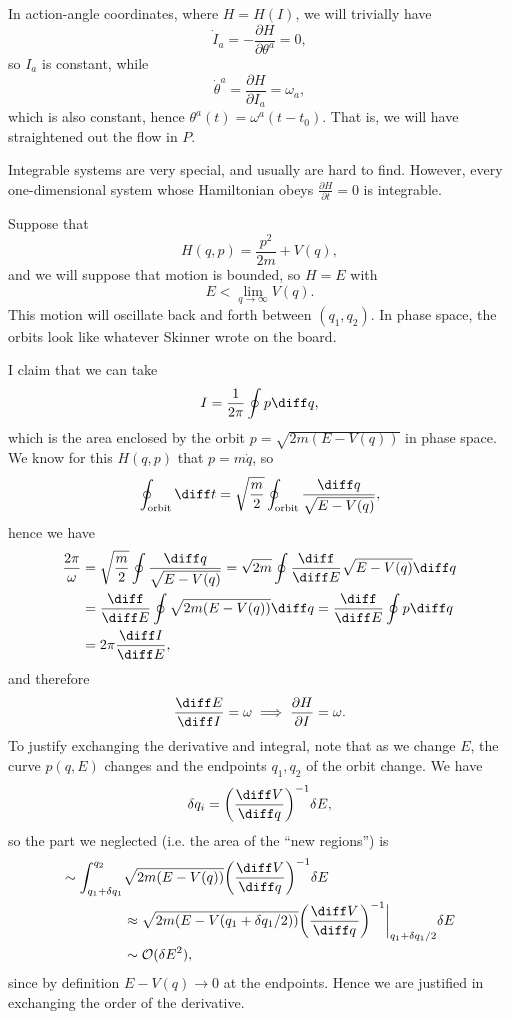 \documentclass[12pt]{article}
\begin{document}
In action-angle coordinates, where $H = H(I)$, we will trivially have
\[
\dot I_a = - \frac{\partial H}{\partial \theta^a} = 0,
\]
so $I_a$ is constant, while
\[
\dot \theta^a = \frac{\partial H}{\partial I_a} = \omega_a,
\]
which is also constant, hence $\theta^a(t) = \omega^a(t - t_0)$. That is, we will have straightened out the flow in $P$.

Integrable systems are very special, and usually are hard to find. However, every one-dimensional system whose Hamiltonian obeys $\frac{\partial H}{\partial t} = 0$ is integrable.

\begin{exbox}
	Suppose that
	\[
	H(q,p) = \frac{p^2}{2m} + V(q),
	\]
	and we will suppose that motion is bounded, so $H = E$ with
	\[
	E < \lim_{q \to \infty}V(q).
	\]
	This motion will oscillate back and forth between $(q_1, q_2)$. In phase space, the orbits look like whatever Skinner wrote on the board.

	I claim that we can take
	\[
	I = \frac{1}{2 \pi} \oint p \diff q,
	\]
	which is the area enclosed by the orbit $p = \sqrt{2m(E - V(q))}$ in phase space. We know for this $H(q, p)$ that $p = m \dot q$, so
	\[
		\oint_{\mathrm{orbit}}\diff t = \sqrt{\frac{m}{2}} \oint_{\mathrm{orbit}} \frac{\diff q}{\sqrt{E - V(q)}},
	\]
	hence we have
	\begin{align*}
		\frac{2\pi}{\omega} &= \sqrt{\frac{m}{2}} \oint \frac{\diff q}{\sqrt{E - V(q)}} = \sqrt{2m} \oint \frac{\diff}{\diff E} \sqrt{E - V(q)} \diff q \\
				    &= \frac{\diff}{\diff E} \oint \sqrt{2m(E-V(q))} \diff q = \frac{\diff}{\diff E} \oint p \diff q \\
				    &= 2 \pi \frac{\diff I}{\diff E},
	\end{align*}
	and therefore
	\[
	\frac{\diff E}{\diff I} = \omega \implies \frac{\partial H}{\partial I} = \omega.
	\]
	To justify exchanging the derivative and integral, note that as we change $E$, the curve $p(q, E)$ changes and the endpoints $q_1, q_2$ of the orbit change. We have
	\[
	\delta q_i = \biggl(\frac{\diff V}{\diff q} \biggr)^{-1} \delta E,
	\]
	so the part we neglected (i.e. the area of the ``new regions'') is
	\begin{align*}
		\sim \int_{q_1 + \delta q_1}^{q_2} &\sqrt{2m(E - V(q))} \biggl( \frac{\diff V}{\diff q} \biggr)^{-1} \delta E \\
						   &\approx \sqrt{2m (E - V(q_1 + \delta q_1/2))} \biggl( \frac{\diff V}{\diff q} \biggr)^{-1} \biggr|_{q_1 + \delta q_1/2} \delta E \\
						   &\sim \mathcal{O}(\delta E^2),
	\end{align*}
	since by definition $E - V(q) \to 0$ at the endpoints. Hence we are justified in exchanging the order of the derivative.
\end{exbox}
\end{document}
